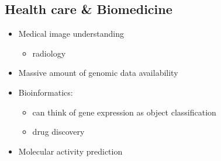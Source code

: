 \documentclass[onecolumn]{IEEEtran}
\newcommand{\bi}{\begin{itemize}}
\newcommand{\ei}{\end{itemize}}
\begin{document}
\subsection{Health care \& Biomedicine\label{biomed_section}}
\begin{itemize}
    \item Medical image understanding
    \bi
        \item radiology
    \ei
    \item Massive amount of genomic data availability
    \item Bioinformatics:
    \bi
        \item can think of gene expression as object classification
        \item drug discovery
    \ei
    \item Molecular activity prediction
\end{itemize}

\newpage
\end{document}
